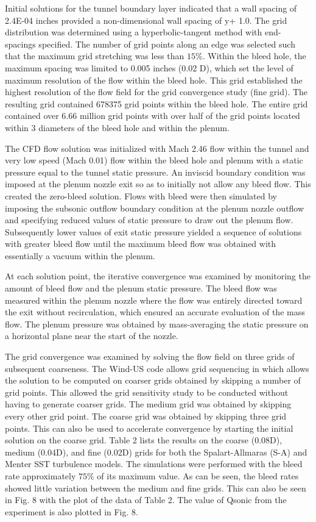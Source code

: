 \documentclass{article}
\begin{document}
Initial solutions for the tunnel boundary layer indicated that a wall spacing of 2.4E-04 inches provided a non-dimensional wall spacing of y+  1.0. The grid distribution was determined using a hyperbolic-tangent method with end-spacings specified. The number of grid points along an edge was selected such that the maximum grid stretching was less than $15\%$. Within the bleed hole, the maximum spacing was limited to 0.005 inches (0.02 D), which set the level of maximum resolution of the flow within the bleed hole. This grid established the highest resolution of the flow field for the grid convergence study (fine grid). The resulting grid contained 678375 grid points within the bleed hole. The entire grid contained over 6.66 million grid points with over half of the grid points located within 3 diameters of the bleed hole and within the plenum. 

The CFD flow solution was initialized with Mach 2.46 flow within the tunnel and very low speed (Mach 0.01) flow within the bleed hole and plenum with a static pressure equal to the tunnel static pressure. An inviscid boundary condition was imposed at the plenum nozzle exit so as to initially not allow any bleed flow. This created the zero-bleed solution. Flows with bleed were then simulated by imposing the subsonic outflow boundary condition at the plenum nozzle outflow and specifying reduced values of static pressure to draw out the plenum flow. Subsequently lower values of exit static pressure yielded a sequence of solutions with greater bleed flow until the maximum bleed flow was obtained with essentially a vacuum within the plenum. 

At each solution point, the iterative convergence was examined by monitoring the amount of bleed flow and the plenum static pressure. The bleed flow was measured within the plenum nozzle where the flow was entirely directed toward the exit without recirculation, which ensured an accurate evaluation of the mass flow. The plenum pressure was obtained by mass-averaging the static pressure on a horizontal plane near the start of the nozzle. 

The grid convergence was examined by solving the flow field on three grids of subsequent coarseness. The Wind-US code allows grid sequencing in which allows the solution to be computed on coarser grids obtained by skipping a number of grid points. This allowed the grid sensitivity study to be conducted without having to generate coarser grids. The medium grid was obtained by skipping every other grid point. The coarse grid was obtained by skipping three grid points. This can also be used to accelerate convergence by starting the initial solution on the coarse grid. Table 2 lists the results on the coarse (0.08D), medium (0.04D), and fine (0.02D) grids for both the Spalart-Allmaras (S-A) and Menter SST turbulence models. The simulations were performed with the bleed rate approximately $75\%$ of its maximum value. As can be seen, the bleed rates showed little variation between the medium and fine grids. This can also be seen in Fig. 8 with the plot of the data of Table 2. The value of Qsonic from the experiment is also plotted in Fig. 8. 
\end{document}
